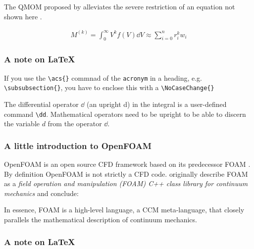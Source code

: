 The \ac{QMOM} proposed by \citet{mcGraw1997} alleviates the severe restriction of 
an equation not shown here \cite{mcGraw1997}. 

\begin{gather}
	M^{(k)} = \int_0^\infty V^k f(V) \dd V \approx \sum_{i=0}^n r_i^k w_i \label{eq:qmomAssumption}
\end{gather}


%
%


\subsubsection*{A note on \LaTeX{}}

If you use the \verb+\acs{}+ commnad of the \verb+acronym+ in a heading, e.g. \verb+\subsubsection{}+, you 
have to enclose this with a \verb+\NoCaseChange{}+

The differential operator $\dd$ (an upright d) in the integral is a user-defined command \verb+\dd+. 
Mathematical operators need to be upright to be able to discern the variable $d$ from the operator $\dd$.





\subsubsection{A little introduction to OpenFOAM}

OpenFOAM is an open source CFD framework based on its predecessor \ac{FOAM} \cite{weller1998}. By 
definition OpenFOAM is not strictly a CFD code. \citet{weller1998} originally describe \ac{FOAM} 
as a \emph{field operation and manipulation (\ac{FOAM}) C++ class library for continuum mechanics} 
and conclude:

\begin{myquote}
In essence, \ac{FOAM} is a high-level language, a \acs{CCM} meta-language, that closely parallels 
the mathematical description of continuum mechanics.
\end{myquote}


\subsubsection*{A note on \LaTeX{}}

